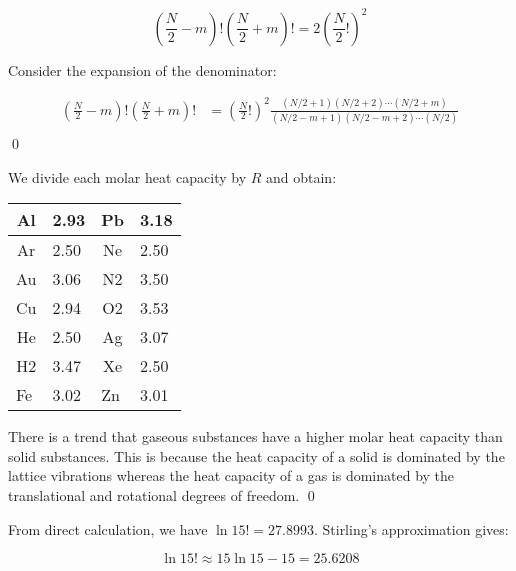 \documentclass[12pt]{article}
\begin{document}
\begin{equation}
    \left( \frac{N}{2} - m \right)! \left( \frac{N}{2} + m \right)! = 2 \left( \frac{N}{2}! \right)^{2}
\end{equation}

Consider the expansion of the denominator:

\begin{equation}
\begin{split}
    \left( \frac{N}{2} - m \right)! \left( \frac{N}{2} + m \right)! &= \left( \frac{N}{2}! \right)^{2} \frac{(N/2 + 1)(N/2 + 2) \cdots (N/2 + m)}{(N/2 - m + 1)(N/2 - m + 2) \cdots (N/2)} \\
\end{split}
\end{equation}
\qed


We divide each molar heat capacity by $R$ and obtain:

\begin{table}[h!]
\centering
\begin{tabular}{|c|l|c|l|}
\hline
Al                       & 2.93 & Pb                      & 3.18 \\ \hline
Ar                       & 2.50 & Ne                      & 2.50 \\ \hline
Au                       & 3.06 & N2                      & 3.50 \\ \hline
Cu                       & 2.94 & O2                      & 3.53 \\ \hline
He                       & 2.50 & Ag                      & 3.07 \\ \hline
H2                       & 3.47 & Xe                      & 2.50 \\ \hline
\multicolumn{1}{|l|}{Fe} & 3.02 & \multicolumn{1}{l|}{Zn} & 3.01 \\ \hline
\end{tabular}
\end{table}

There is a trend that gaseous substances have a higher molar heat capacity than solid substances. This is because the heat capacity of a solid is dominated by the lattice vibrations whereas the heat capacity of a gas is dominated by the translational and rotational degrees of freedom.
\qed


From direct calculation, we have $\ln{15!} = 27.8993$. Stirling's approximation gives:

\begin{equation}
    \ln{15!} \approx 15\ln{15} - 15 = 25.6208
\end{equation}
\end{document}
